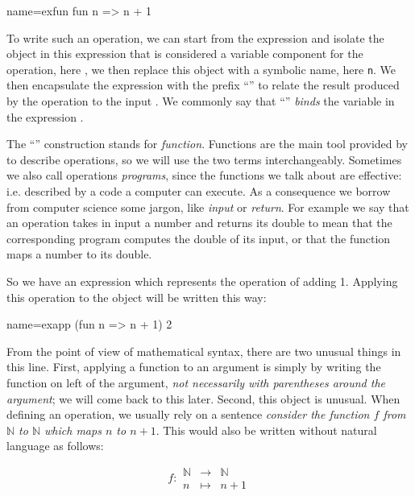 \begin{coq}{name=exfun}{}
  fun n => n + 1
\end{coq}
To write such an operation, we can start from the expression 
and isolate the object in this expression that is considered a
variable component for the operation, here , we then replace
this object with a symbolic name, here {\tt n}.  We then encapsulate
the expression  with the prefix ``'' to relate
the result produced by the operation to the input .  We commonly
say that ``'' \emph{binds} the variable  in the expression
.

The ``'' construction stands for \emph{function}.  Functions are the
main tool provided by \Coq{} to describe operations, so we will use the
two terms interchangeably.  Sometimes we also call operations \emph{programs},
since the functions we talk about are effective: i.e. described by a code
a computer can execute.  As a consequence we borrow from computer science
some jargon, like \emph{input} or \emph{return}. For example we say that
an operation takes in input a number and returns its double to mean
that the corresponding program computes the double of its input, or
that the function maps a number to its double.

So we have an expression which represents the operation of adding 1.
Applying this operation to the object  will be written this
way:

\begin{coq}{name=exapp}{}
  (fun n => n + 1) 2
\end{coq}
From the point of view of mathematical syntax, there are two unusual 
things in this line.  First, applying a function to an argument is simply
by writing the function on left of the argument, {\em not necessarily
with parentheses around the argument}; we will come back to this later.
Second, this object  is unusual.  
When defining an operation, we usually
rely on a sentence {\em consider the function \(f\) from {\(\mathbb{N}\)}
to {\(\mathbb{N}\)} which maps \(n\) to \(n + 1\)}.  This would also be
written without natural language as follows:

\begin{equation}\label{equation:f}
f : 
\begin{array}{ccc}
{\mathbb{N}} &\rightarrow& {\mathbb{N}}\\
n &\mapsto& n + 1
\end{array}
\end{equation}

